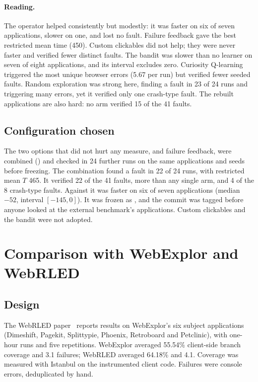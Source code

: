 \paragraph{Reading.} The  operator helped consistently but modestly: it
was faster on six of seven applications, slower on one, and lost no fault. Failure feedback
gave the best restricted mean time (450). Custom clickables did not help; they were never
faster and verified fewer distinct faults. The bandit was slower than no learner on seven of
eight applications, and its interval excludes zero. Curiosity Q-learning triggered the most
unique browser errors (5.67 per run) but verified fewer seeded faults. Random exploration
was strong here, finding a fault in 23 of 24 runs and triggering many errors, yet it
verified only one crash-type fault. The rebuilt applications are also hard: no arm verified
15 of the 41 faults.

\subsection{Configuration chosen}

The two options that did not hurt any measure,  and failure feedback,
were combined () and checked in 24 further runs on the same
applications and seeds before freezing. The combination found a fault in 22 of 24 runs,
with restricted mean $T$ 465. It verified 22 of the 41 faults, more than any single arm, and
4 of the 8 crash-type faults. Against  it was faster on six of seven
applications (median $-52$, interval $[-145, 0]$). It was frozen as ,
and the commit was tagged before anyone looked at the external benchmark's applications.
Custom clickables and the bandit were not adopted.

\section{Comparison with WebExplor and WebRLED}
\label{sec:extresults}

\subsection{Design}

The WebRLED paper~\cite{gu2025webrled} reports results on WebExplor's six subject
applications (Dimeshift, Pagekit, Splittypie, Phoenix, Retroboard and Petclinic), with
one-hour runs and five repetitions. WebExplor averaged 55.54\% client-side branch coverage
and 3.1 failures; WebRLED averaged 64.18\% and 4.1. Coverage was measured with Istanbul on
the instrumented client code. Failures were console errors, deduplicated by hand.

